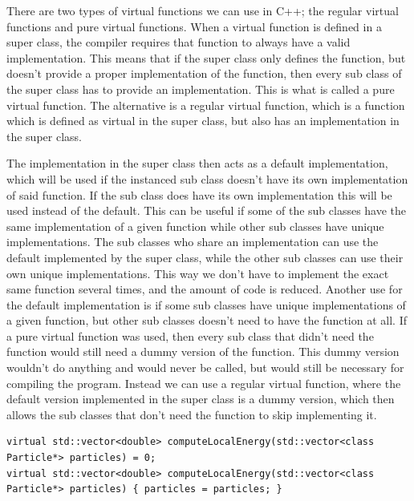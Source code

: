 \documentclass[../main.tex]{subfiles}
\begin{document}
There are two types of virtual functions we can use in C++; the regular virtual functions and pure virtual functions. When a virtual function is defined in a super class, the compiler requires that function to always have a valid implementation. This means that if the super class only defines the function, but doesn't provide a proper implementation of the function, then every sub class of the super class has to provide an implementation. This is what is called a pure virtual function. The alternative is a regular virtual function, which is a function which is defined as virtual in the super class, but also has an implementation in the super class. 

The implementation in the super class then acts as a default implementation, which will be used if the instanced sub class doesn't have its own implementation of said function. If the sub class does have its own implementation this will be used instead of the default. This can be useful if some of the sub classes have the same implementation of a given function while other sub classes have unique implementations. The sub classes who share an implementation can use the default implemented by the super class, while the other sub classes can use their own unique implementations. This way we don't have to implement the exact same function several times, and the amount of code is reduced. Another use for the default implementation is if some sub classes have unique implementations of a given function, but other sub classes doesn't need to have the function at all. If a pure virtual function was used, then every sub class that didn't need the function would still need a dummy version of the function. This dummy version wouldn't do anything and would never be called, but would still be necessary for compiling the program. Instead we can use a regular virtual function, where the default version implemented in the super class is a dummy version, which then allows the sub classes that don't need the function to skip implementing it.

\lstset{language=c++}
\begin{lstlisting}[caption={Example of definitions of a pure virtual function (line $1$) and a regular virtual function with a dummy implementation (line $2$).}]
virtual std::vector<double> computeLocalEnergy(std::vector<class Particle*> particles) = 0;
virtual std::vector<double> computeLocalEnergy(std::vector<class Particle*> particles) { particles = particles; }
\end{lstlisting}
\end{document}
